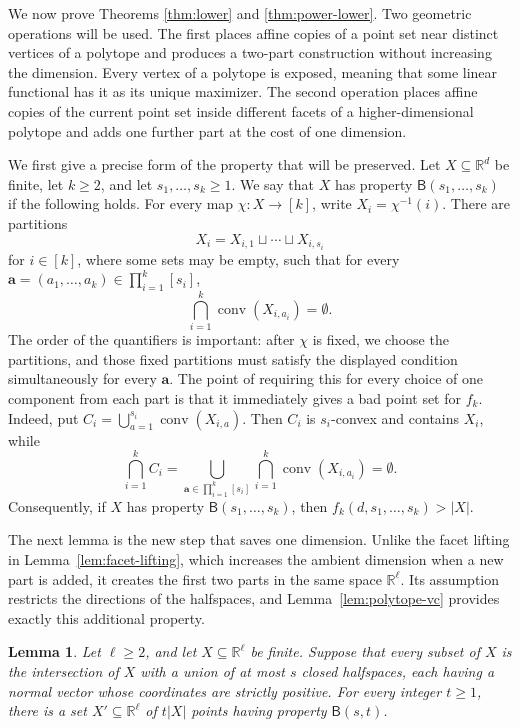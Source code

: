 \documentclass[11pt]{article}
\newtheorem{lemma}[theorem]{Lemma}
\theoremstyle{definition}
\newcommand*{\abs}[1]{\lvert#1\rvert}
\newcommand{\R}{\mathbb{R}}
\begin{document}
We now prove Theorems \ref{thm:lower} and \ref{thm:power-lower}. Two geometric operations will be used. The first places affine copies of a point set near distinct vertices of a polytope and produces a two-part construction without increasing the dimension. Every vertex of a polytope is exposed, meaning that some linear functional has it as its unique maximizer. The second operation places affine copies of the current point set inside different facets of a higher-dimensional polytope and adds one further part at the cost of one dimension.

We first give a precise form of the property that will be preserved. Let \(X\subseteq\R^{d}\) be finite, let \(k\ge2\), and let \(s_{1},\ldots,s_{k}\ge1\). We say that \(X\) has property \(\mathsf{B}(s_{1},\ldots,s_{k})\) if the following holds. For every map \(\chi:X\to[k]\), write \(X_{i}=\chi^{-1}(i)\). There are partitions
\[
X_{i}=X_{i,1}\sqcup\cdots\sqcup X_{i,s_{i}}
\]
for \(i\in[k]\), where some sets may be empty, such that for every \(\boldsymbol{a}=(a_{1},\ldots,a_{k})\in\prod_{i=1}^{k}[s_{i}]\),
\[
\bigcap_{i=1}^{k}\operatorname{conv}(X_{i,a_{i}})=\emptyset.
\]
The order of the quantifiers is important: after \(\chi\) is fixed, we choose the partitions, and those fixed partitions must satisfy the displayed condition simultaneously for every \(\boldsymbol{a}\).
The point of requiring this for every choice of one component from each part is that it immediately gives a bad point set for \(f_{k}\). Indeed, put \(C_{i}=\bigcup_{a=1}^{s_{i}}\operatorname{conv}(X_{i,a})\). Then \(C_{i}\) is \(s_{i}\)-convex and contains \(X_{i}\), while
\[
\bigcap_{i=1}^{k}C_{i}=\bigcup_{\boldsymbol{a}\in\prod_{i=1}^{k}[s_{i}]}\bigcap_{i=1}^{k}\operatorname{conv}(X_{i,a_{i}})=\emptyset.
\]
Consequently, if \(X\) has property \(\mathsf{B}(s_{1},\ldots,s_{k})\), then \(f_{k}(d,s_{1},\ldots,s_{k})>\abs{X}\).

The next lemma is the new step that saves one dimension. Unlike the facet lifting in Lemma~\ref{lem:facet-lifting}, which increases the ambient dimension when a new part is added, it creates the first two parts in the same space \(\R^{\ell}\). Its assumption restricts the directions of the halfspaces, and Lemma~\ref{lem:polytope-vc} provides exactly this additional property.

\begin{lemma}\label{lem:two-part-amplification}
Let \(\ell\ge2\), and let \(X\subseteq\R^{\ell}\) be finite. Suppose that every subset of \(X\) is the intersection of \(X\) with a union of at most \(s\) closed halfspaces, each having a normal vector whose coordinates are strictly positive. For every integer \(t\ge1\), there is a set \(X'\subseteq\R^{\ell}\) of \(t\abs{X}\) points having property \(\mathsf{B}(s,t)\).
\end{lemma}
\end{document}
